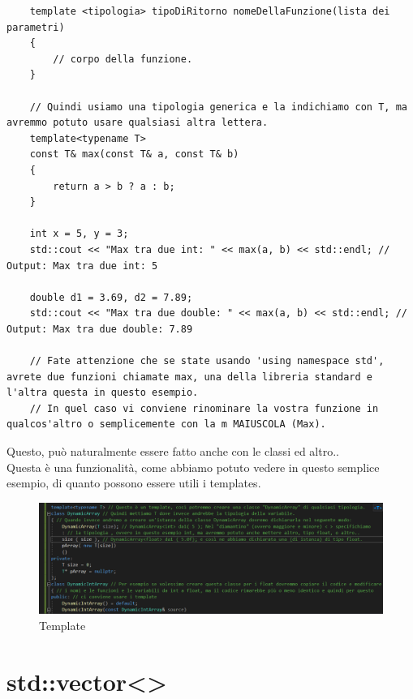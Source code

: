 \begin{lstlisting}
	template <tipologia> tipoDiRitorno nomeDellaFunzione(lista dei parametri)
	{
		// corpo della funzione.
	}

	// Quindi usiamo una tipologia generica e la indichiamo con T, ma avremmo potuto usare qualsiasi altra lettera.
	template<typename T>
	const T& max(const T& a, const T& b)
	{
		return a > b ? a : b;
	}

	int x = 5, y = 3;
	std::cout << "Max tra due int: " << max(a, b) << std::endl; // Output: Max tra due int: 5
	
	double d1 = 3.69, d2 = 7.89;
	std::cout << "Max tra due double: " << max(a, b) << std::endl; // Output: Max tra due double: 7.89
	
	// Fate attenzione che se state usando 'using namespace std', avrete due funzioni chiamate max, una della libreria standard e l'altra questa in questo esempio.
	// In quel caso vi conviene rinominare la vostra funzione in qualcos'altro o semplicemente con la m MAIUSCOLA (Max).
\end{lstlisting}

\textsf{\small Questo, può naturalmente essere fatto anche con le classi ed altro..} \\

\textsf{\small Questa è una funzionalità, come abbiamo potuto vedere in questo semplice esempio, di quanto possono essere utili i templates.} \\

\begin{figure}[ht]
	\centering
	\includegraphics[width=1.2\textwidth, height=1.2\textheight, keepaspectratio]{./imgs/template.png}
	\caption{Template}
	\label{fig:template}
\end{figure}



\section{std::vector<>}

